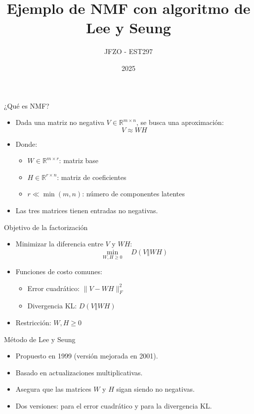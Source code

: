 \documentclass{beamer}
\title{Ejemplo de NMF con algoritmo de Lee y Seung}
\author{JFZO - EST297}
\date{2025}
\begin{document}
\frame{\titlepage}


\begin{frame}{¿Qué es NMF?}
\begin{itemize}
    \item Dada una matriz no negativa \( V \in \mathbb{R}^{m \times n} \), se busca una aproximación:
    \[
    V \approx WH
    \]
    \item Donde:
    \begin{itemize}
        \item \( W \in \mathbb{R}^{m \times r} \): matriz base
        \item \( H \in \mathbb{R}^{r \times n} \): matriz de coeficientes
        \item \( r \ll \min(m, n) \): número de componentes latentes
    \end{itemize}
    \item Las tres matrices tienen entradas no negativas.
\end{itemize}
\end{frame}

\begin{frame}{Objetivo de la factorización}
\begin{itemize}
    \item Minimizar la diferencia entre \( V \) y \( WH \):
    \[
    \min_{W, H \geq 0} \quad D(V \Vert WH)
    \]
    \item Funciones de costo comunes:
    \begin{itemize}
        \item Error cuadrático: \( \| V - WH \|_F^2 \)
        \item Divergencia KL: \( D(V \Vert WH) \)
    \end{itemize}
    \item Restricción: \( W, H \geq 0 \)
\end{itemize}
\end{frame}

\begin{frame}{Método de Lee y Seung}
\begin{itemize}
    \item Propuesto en 1999 (versión mejorada en 2001).
    \item Basado en actualizaciones multiplicativas.
    \item Asegura que las matrices \( W \) y \( H \) sigan siendo no negativas.
    \item Dos versiones: para el error cuadrático y para la divergencia KL.
\end{itemize}
\end{frame}
\end{document}
